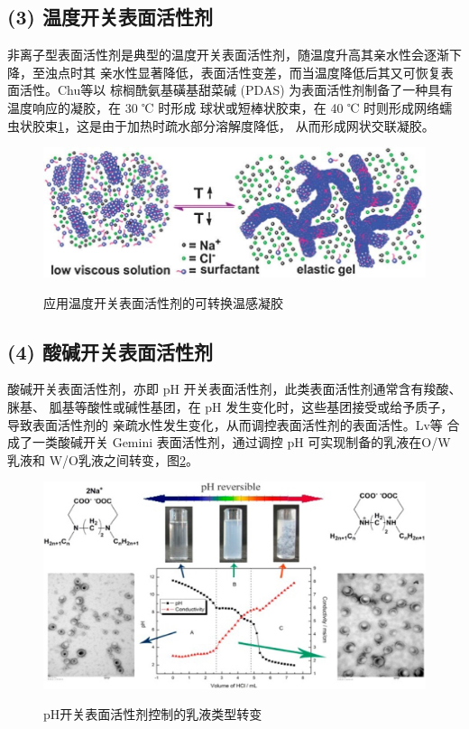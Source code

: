 \documentclass[bachelor,winfonts,replaceperiod]{jnuthesis}
\begin{document}
    \subsection*{(3) 温度开关表面活性剂}
    非离子型表面活性剂是典型的温度开关表面活性剂，随温度升高其亲水性会逐渐下降，至浊点时其
    亲水性显著降低，表面活性变差，而当温度降低后其又可恢复表面活性。Chu\cite{chu2011}等以
    棕榈酰氨基磺基甜菜碱 (PDAS) 为表面活性剂制备了一种具有温度响应的凝胶，在 30 ℃ 时形成
    球状或短棒状胶束，在 40 ℃ 时则形成网络蠕虫状胶束\ref{fig:switchable-temperature}，这是由于加热时疏水部分溶解度降低，
    从而形成网状交联凝胶。
    \begin{figure}[htbp]
        \centering
        \includegraphics[width=.6\textwidth]{figure/switchable-temperature.jpg}\\
        \caption{应用温度开关表面活性剂的可转换温感凝胶\cite{chu2011}}
        \label{fig:switchable-temperature}
    \end{figure}

    \subsection*{(4) 酸碱开关表面活性剂}
    酸碱开关表面活性剂，亦即 pH 开关表面活性剂，此类表面活性剂通常含有羧酸、脒基、
    胍基等酸性或碱性基团，在 pH 发生变化时，这些基团接受或给予质子，导致表面活性剂的
    亲疏水性发生变化，从而调控表面活性剂的表面活性\cite{吕湘亮2018}。Lv等\cite{lv2014}
    合成了一类酸碱开关 Gemini 表面活性剂，通过调控 pH 可实现制备的乳液在O/W乳液和
    W/O乳液之间转变，图\ref{fig:switchable-ph}。
    \begin{figure}[htbp]
        \centering
        \includegraphics[width=.8\textwidth]{figure/switchable-ph.jpg}\\
        \caption{pH开关表面活性剂控制的乳液类型转变\cite{lv2014}}
        \label{fig:switchable-ph}
    \end{figure}
\end{document}
